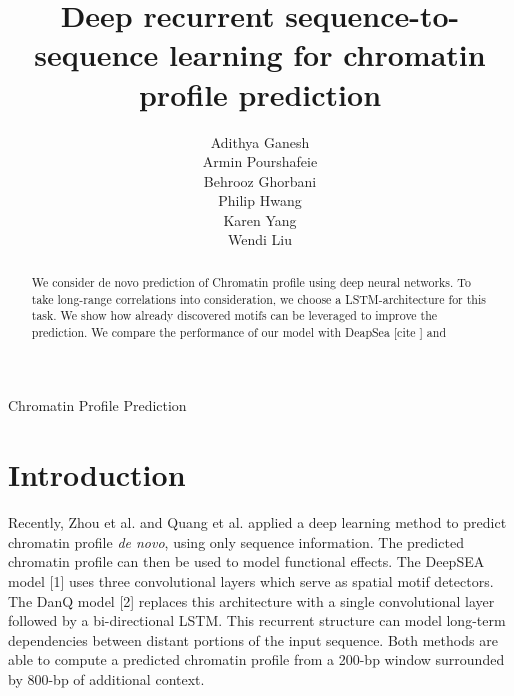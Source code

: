 \documentclass[twoside,11pt]{article}
\begin{document}
\title{Deep recurrent sequence-to-sequence learning for chromatin profile prediction}

\author{\name Adithya Ganesh \\
		\name Armin Pourshafeie \\
        \name Behrooz Ghorbani \\
        \name Philip Hwang \\
        \name Karen Yang \\
        \name Wendi Liu}

\editor{}

\maketitle

\begin{abstract}%
We consider de novo prediction of Chromatin profile using deep neural networks. To take long-range correlations into consideration, we choose a LSTM-architecture for this task. We show how already discovered motifs can be leveraged to improve the prediction. We compare the performance of our model with DeapSea [cite ] and 
%
%
\end{abstract}

\begin{keywords}
  Chromatin Profile Prediction
\end{keywords}

\section{Introduction}
Recently, Zhou et al. \cite{zhou2015predicting} and Quang et al. \cite{quang2016danq} applied a deep learning method to predict chromatin profile {\it de novo}, using only sequence information. The predicted chromatin profile can then be used to model functional effects.  The DeepSEA model [1]  uses three convolutional layers which serve as spatial motif detectors.  The DanQ model [2] replaces this architecture with a single convolutional layer followed by a bi-directional LSTM.  This recurrent structure can model long-term dependencies between distant portions of the input sequence.  Both methods are able to compute a predicted chromatin profile from a 200-bp window surrounded by 800-bp of additional context.
\end{document}
